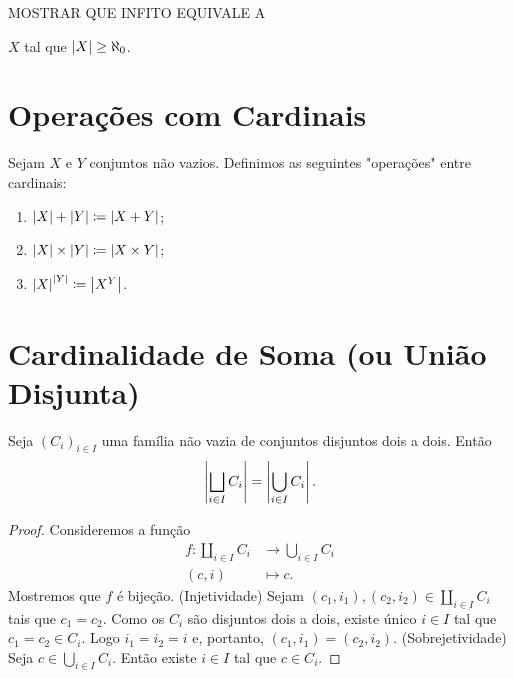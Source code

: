 	MOSTRAR QUE INFITO EQUIVALE A

$X$ tal que $\left\vert{X}\right\vert \geq \aleph_0$.

\section{Operações com Cardinais}

\begin{defi}
	Sejam $X$ e $Y$ conjuntos não vazios. Definimos as seguintes "operações" entre cardinais:
	\begin{enumerate}
	\item $\left\vert{X}\right\vert + \left\vert{Y}\right\vert \coloneqq \left\vert{X + Y}\right\vert$;
	\item $\left\vert{X}\right\vert \times \left\vert{Y}\right\vert \coloneqq \left\vert{X \times Y}\right\vert$;
	\item $\left\vert{X}\right\vert^{\left\vert{Y}\right\vert} \coloneqq \left\vert{X^Y}\right\vert$.
	\end{enumerate}
\end{defi}

\section{Cardinalidade de Soma (ou União Disjunta)}

\begin{prop}
\label{conj:prop.un.dis}
Seja $(C_i)_{i \in I}$ uma família não vazia de conjuntos disjuntos dois a dois. Então
	\begin{equation*}
	\left\vert{\bigsqcup_{i \in I} C_i}\right\vert = \left\vert{\bigcup_{i \in I} C_i}\right\vert.
	\end{equation*}
\end{prop}
\begin{proof}
Consideremos a função
	\begin{align*}
	f: \coprod_{i \in I} C_i &\to \bigcup_{i \in I} C_i \\
			(c,i) &\mapsto c.
	\end{align*}
Mostremos que $f$ é bijeção. (Injetividade) Sejam $(c_1,i_1),(c_2,i_2) \in \coprod_{i \in I} C_i$ tais que $c_1=c_2$. Como os $C_i$ são disjuntos dois a dois, existe único $i \in I$ tal que $c_1=c_2 \in C_i$. Logo $i_1=i_2=i$ e, portanto, $(c_1,i_1)=(c_2,i_2)$. (Sobrejetividade) Seja $c \in \bigcup_{i \in I} C_i$. Então existe $i \in I$ tal que $c \in C_i$.
\end{proof}

